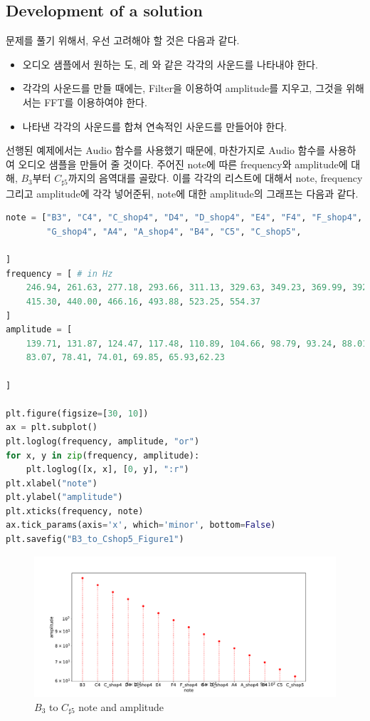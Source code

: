 \documentclass[11pt]{article}
\begin{document}
\subsection{Development of a solution} 
문제를 풀기 위해서, 우선 고려해야 할 것은 다음과 같다.
\begin{itemize}
    \item 오디오 샘플에서 원하는 도, 레 와 같은 각각의 사운드를 나타내야 한다.
    	\item 각각의 사운드를 만들 때에는, Filter을 이용하여 amplitude를 지우고, 그것을 위해서는 FFT를 이용하여야 한다.
    \item 나타낸 각각의 사운드를 합쳐 연속적인 사운드를 만들어야 한다.
    
\end{itemize}




선행된 예제에서는 Audio 함수를 사용했기 때문에, 마찬가지로 Audio 함수를 사용하여 오디오 샘플을 만들어 줄 것이다.  주어진 note에 따른 frequency와 amplitude에 대해, $B_3$부터 $C_{\sharp5}$까지의 음역대를 골랐다. 이를 각각의 리스트에 대해서 note, frequency 그리고 amplitude에 각각 넣어준뒤, note에 대한 amplitude의 그래프는 다음과 같다.

\begin{lstlisting}[language=Python]
note = ["B3", "C4", "C_shop4", "D4", "D_shop4", "E4", "F4", "F_shop4", "G4", 
        "G_shop4", "A4", "A_shop4", "B4", "C5", "C_shop5",
        
]
frequency = [ # in Hz
    246.94, 261.63, 277.18, 293.66, 311.13, 329.63, 349.23, 369.99, 392.00, 
    415.30, 440.00, 466.16, 493.88, 523.25, 554.37
]
amplitude = [
    139.71, 131.87, 124.47, 117.48, 110.89, 104.66, 98.79, 93.24, 88.01, 
    83.07, 78.41, 74.01, 69.85, 65.93,62.23
    
]

plt.figure(figsize=[30, 10])
ax = plt.subplot()
plt.loglog(frequency, amplitude, "or")
for x, y in zip(frequency, amplitude):
    plt.loglog([x, x], [0, y], ":r")
plt.xlabel("note")
plt.ylabel("amplitude")
plt.xticks(frequency, note)
ax.tick_params(axis='x', which='minor', bottom=False)
plt.savefig("B3_to_Cshop5_Figure1")
\end{lstlisting}

\begin{figure}[!ht]
  \centering
  \includegraphics[width=1\textwidth]{B3_to_Cshop5_Figure1.pdf}
  \caption{$B_{3}$ to $C_{\sharp5}$  note and amplitude}
\end{figure}
\end{document}
